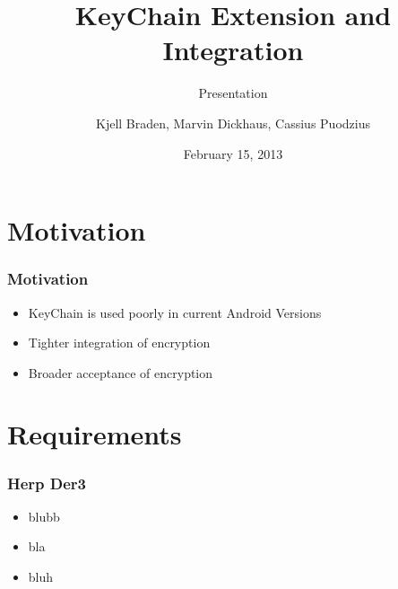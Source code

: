 \documentclass{beamer}
\title{KeyChain Extension and Integration}
\subtitle{Presentation}
\author[Braden, Dickhaus, Puodzius]{Kjell Braden, Marvin Dickhaus, Cassius Puodzius}
\institute{Fachbereich Informatik \\ TU Darmstadt}
\date{February 15, 2013}
\begin{document}
\begin{frame}
	\titlepage
\end{frame}
\begin{frame}
	\tableofcontents
\end{frame}

\section{Motivation}
	\begin{frame}
		\tableofcontents[currentsection]
	\end{frame}
	\begin{frame}
	\frametitle{Motivation}
	\begin{itemize}
		\item KeyChain is used poorly in current Android Versions
		\item Tighter integration of encryption
		\item Broader acceptance of encryption
	\end{itemize}
	\end{frame}

\section{Requirements}
	\begin{frame}
		\tableofcontents[currentsection]
	\end{frame}
	\begin{frame}
	\frametitle{Herp Der3}
		\begin{itemize}
			\item blubb
			\item bla
			\item bluh
		\end{itemize}
	\end{frame}
\end{document}
